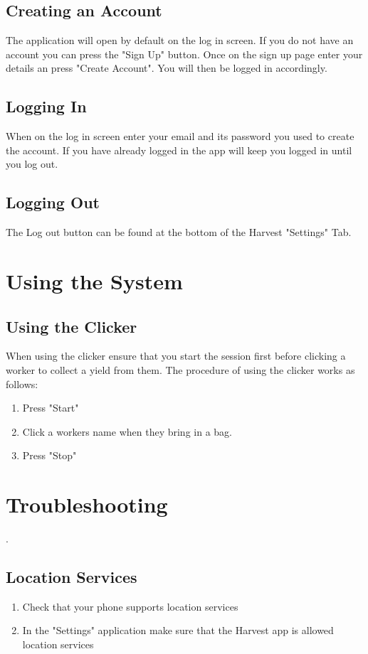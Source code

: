 \documentclass[11pt]{article}
\begin{document}
\subsection{Creating an Account}
The application will open by default on the log in screen. If you do not have an account you can press the "Sign Up" button. Once on the sign up page enter your details an press "Create Account". You will then be logged in accordingly.

\subsection{Logging In}
When on the log in screen enter your email and its password you used to create the account. If you have already logged in the app will keep you logged in until you log out.

\subsection{Logging Out}
The Log out button can be found at the bottom of the Harvest "Settings" Tab.

\newpage
\section{Using the System}

\subsection{Using the Clicker}
When using the clicker ensure that you start the session first before clicking a worker to collect a yield from them. The procedure of using the clicker works as follows:

\begin{enumerate}
\item Press "Start"
\item Click a workers name when they bring in a bag.
\item Press "Stop"
\end{enumerate}

\newpage
\section{Troubleshooting}.

\subsection{Location Services}
\begin{enumerate}
\item Check that your phone supports location services
\item In the "Settings" application make sure that the Harvest app is allowed location services 
\end{enumerate}
\end{document}
